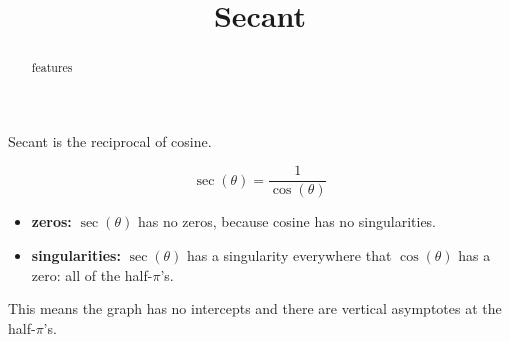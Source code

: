 \documentclass{ximera}
\title{Secant}
\begin{document}
\begin{abstract}
features
\end{abstract}
\maketitle



Secant is the reciprocal of cosine. 

\[   \sec(\theta)  =  \frac{1}{\cos(\theta)}  \]



\begin{itemize}
\item \textbf{zeros:} $\sec(\theta)$ has no zeros, because cosine has no singularities.
\item \textbf{singularities:} $\sec(\theta)$ has a singularity everywhere that $\cos(\theta)$ has a zero:  all of the half-$\pi$'s.
\end{itemize}

This means the graph has no intercepts and there are vertical asymptotes at the half-$\pi$'s.
\end{document}
